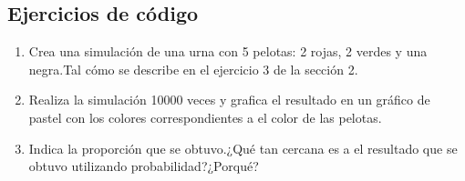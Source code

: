 \documentclass{article}
\begin{document}
\subsection{Ejercicios de código}
\begin{enumerate}
\item Crea una simulación de una urna con 5 pelotas: 2 rojas, 2 verdes y una negra.Tal cómo se describe en el ejercicio 3 de la sección 2.
\item Realiza la simulación 10000 veces y grafica el resultado en un gráfico de pastel con los colores correspondientes a el color de las pelotas.
\item Indica la proporción que se obtuvo.¿Qué tan cercana es a el resultado que se obtuvo utilizando probabilidad?¿Porqué?


\end{enumerate}
\end{document}
